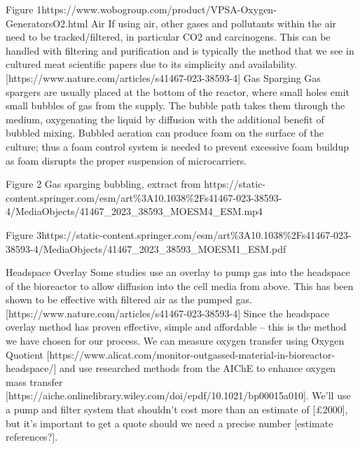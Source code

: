 Figure 1https://www.wobogroup.com/product/VPSA-Oxygen-GeneratorsO2.html
Air
If using air, other gases and pollutants within the air need to be tracked/filtered, in particular CO2 and carcinogens. This can be handled with filtering and purification and is typically the method that we see in cultured meat scientific papers due to its simplicity and availability. [https://www.nature.com/articles/s41467-023-38593-4]
Gas Sparging
Gas spargers are usually placed at the bottom of the reactor, where small holes emit small bubbles of gas from the supply. The bubble path takes them through the medium, oxygenating the liquid by diffusion with the additional benefit of bubbled mixing.
Bubbled aeration can produce foam on the surface of the culture; thus a foam control system is needed to prevent excessive foam buildup as foam disrupts the proper suspension of microcarriers.
 
Figure 2 Gas sparging bubbling, extract from https://static-content.springer.com/esm/art\%3A10.1038\%2Fs41467-023-38593-4/MediaObjects/41467_2023_38593_MOESM4_ESM.mp4
 
Figure 3https://static-content.springer.com/esm/art\%3A10.1038\%2Fs41467-023-38593-4/MediaObjects/41467_2023_38593_MOESM1_ESM.pdf
 
Headspace Overlay
Some studies use an overlay to pump gas into the headspace of the bioreactor to allow diffusion into the cell media from above. This has been shown to be effective with filtered air as the pumped gas. [https://www.nature.com/articles/s41467-023-38593-4]
Since the headspace overlay method has proven effective, simple and affordable – this is the method we have chosen for our process. We can measure oxygen transfer using Oxygen Quotient [https://www.alicat.com/monitor-outgassed-material-in-bioreactor-headspace/] and use researched methods from the AIChE to enhance oxygen mass transfer [https://aiche.onlinelibrary.wiley.com/doi/epdf/10.1021/bp00015a010]. We’ll use a pump and filter system that shouldn’t cost more than an estimate of [£2000], but it’s important to get a quote should we need a precise number [estimate references?].
 
